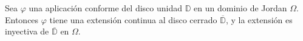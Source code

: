 \begin{comment}
\begin{prop}
    Sea $U \subset \mathbb{C}$. Una aplicación $f: U \rightarrow \mathbb{C}$ es conforme en $U$ si satisface las condiciones de Cauchy-Riemann y $f'(z) \not = 0 \, \forall z \in U$.
\end{prop}

\begin{proof}
    Sea $f$ una función continua tal que $f(z) = u(x,y) + i v(x,y), z = x+iv$. Sabemos, por hipótesis, que $u(x,y)$ y $v(x,y)$ son funciones continuamente diferenciables.

    Consideremos la curva simple $\gamma : [a,b] \rightarrow U$, que escribimos como $\gamma (t) = \rho (t) + i \sigma (t)$. Entonces,
    \begin{equation*}
        f(\gamma (t)) = u(\rho (t), \sigma (t)) + i v(\rho (t), \sigma (t)).
    \end{equation*}

    Como $f(\gamma (t))$ es continuamente diferenciable,
    \begin{equation}
        \label{cauchy-riemann}
        \frac{d}{dt}f(\gamma (t)) = u_x \rho' (t) + u_y \sigma' (t) + i (v_x \rho'(t) + v_y \sigma'(t)).
    \end{equation}

    Por hipótesis tenemos que
    \begin{equation*}
        \frac{\partial (u,v)}{\partial (x,y)} =
        \left|
        \begin{matrix}
            u_x(x,y) & u_y(x,y) \\ v_x(x,y) & v_y(x,y)
        \end{matrix}
        \right| \not = 0,
    \end{equation*}
    por lo que $\frac{d}{dt} f(\gamma (t)) \not = 0$ en $t = 0$ pues $\rho' (t) + i \sigma' (t) = \gamma' (t) \not = 0$. Es decir, la curva $f (\gamma)$ es simple en un entorno de su origen. Por lo tanto, si $\gamma_1$ y $\gamma_2$ son curvas simples con origen $c$, el ángulo entre $f(\gamma_1)$ y $f(\gamma_2)$ en $f(c)$ está bien definido.
\end{proof}
\end{comment}
\bigskip

\begin{theorem}
    Sea $\varphi$ una aplicación conforme del disco unidad $\mathbb{D}$ en un dominio de Jordan $\Omega$. Entonces $\varphi$ tiene una extensión continua al disco cerrado $\overline{\mathbb{D}}$, y la extensión es inyectiva de $\overline{\mathbb{D}}$ en $\Omega$.
\end{theorem}

